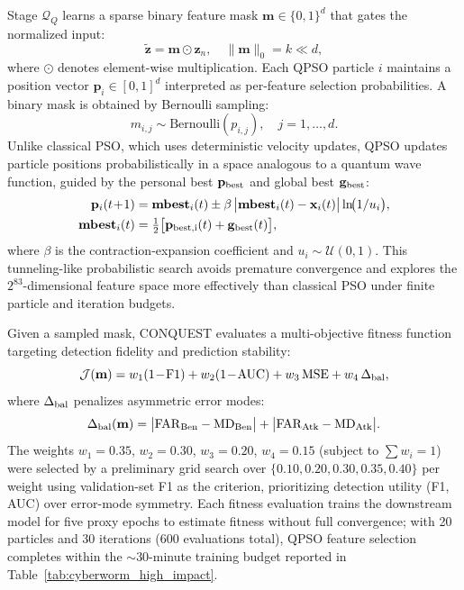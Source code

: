 \documentclass[conference]{IEEEtran}
\begin{document}
Stage $\mathcal{Q}_{Q}$ learns a sparse binary feature mask
$\mathbf{m}\in\{0,1\}^d$ that gates the normalized input:
\begin{equation}
\tilde{\mathbf{z}} = \mathbf{m}\odot\mathbf{z}_n,\quad
\|\mathbf{m}\|_0 = k \ll d,
\label{eq:mask_gate}
\end{equation}
where $\odot$ denotes element-wise multiplication. Each QPSO
particle $i$ maintains a position vector
$\mathbf{p}_i\in[0,1]^d$ interpreted as per-feature selection
probabilities. A binary mask is obtained by Bernoulli sampling:
\begin{equation}
m_{i,j} \sim \mathrm{Bernoulli}(p_{i,j}),\quad j=1,\dots,d.
\label{eq:bern}
\end{equation}
Unlike classical PSO, which uses deterministic velocity updates,
QPSO updates particle positions probabilistically in a space
analogous to a quantum wave function, guided by the personal best
$\mathbf{p}_{\rm best}$ and global best $\mathbf{g}_{\rm best}$:
\begin{align}
\mathbf{p}_{i}(t\!+\!1) &=
\mathbf{mbest}_i(t) \pm
\beta\,\bigl|\mathbf{mbest}_i(t)-\mathbf{x}_i(t)\bigr|
\ln\!\bigl(1/u_i\bigr), \label{eq:qpso_update}\\
\mathbf{mbest}_i(t) &=
\tfrac{1}{2}\bigl[\mathbf{p}_{\rm best,i}(t)+
\mathbf{g}_{\rm best}(t)\bigr],
\label{eq:mbest}
\end{align}
where $\beta$ is the contraction-expansion coefficient and
$u_i\sim\mathcal{U}(0,1)$. This tunneling-like probabilistic
search avoids premature convergence and explores the
$2^{83}$-dimensional feature space more effectively than classical
PSO under finite particle and iteration budgets.

Given a sampled mask, CONQUEST evaluates a multi-objective fitness
function targeting detection fidelity and prediction stability:
\begin{equation}
\mathcal{J}(\mathbf{m}) =
w_1(1\!-\!\mathrm{F1}) + w_2(1\!-\!\mathrm{AUC})
+ w_3\,\mathrm{MSE} + w_4\,\Delta_{\rm bal},
\label{eq:qpsobj}
\end{equation}
where $\Delta_{\rm bal}$ penalizes asymmetric error modes:
\begin{equation}
\Delta_{\rm bal}(\mathbf{m}) =
\bigl|\mathrm{FAR}_{\rm Ben}-\mathrm{MD}_{\rm Ben}\bigr|
+\bigl|\mathrm{FAR}_{\rm Atk}-\mathrm{MD}_{\rm Atk}\bigr|.
\label{eq:balance}
\end{equation}
The weights $w_1\!=\!0.35$, $w_2\!=\!0.30$, $w_3\!=\!0.20$,
$w_4\!=\!0.15$ (subject to $\sum w_i=1$) were selected by a
preliminary grid search over $\{0.10, 0.20, 0.30, 0.35, 0.40\}$
per weight using validation-set F1 as the criterion, prioritizing
detection utility (F1, AUC) over error-mode symmetry. Each fitness
evaluation trains the downstream model for five proxy epochs to
estimate fitness without full convergence; with 20 particles and
30 iterations (600 evaluations total), QPSO feature selection
completes within the $\sim$30-minute training budget reported in
Table~\ref{tab:cyberworm_high_impact}.
\end{document}
